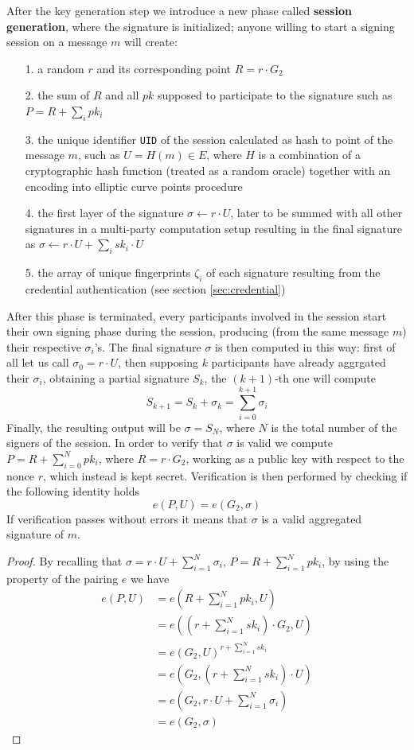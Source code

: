 \documentclass[twocolumn]{article}
\begin{document}
After the key generation step we introduce a new phase called \textbf{session generation}, where the signature is initialized; anyone willing to start a signing session on a message $m$ will create:
\begin{itemize}
    \item[1.] a random $r$ and its corresponding point $R = r\cdot G_2$
    \item[2.] the sum of $R$ and all $pk$ supposed to participate to the signature such as $P = R + \sum_i pk_i$
    \item[3.] the unique identifier \verb!UID! of the session calculated as hash to point of the message $m$, such as $U = H(m)\in E$, where $H$ is a combination of a cryptographic hash function (treated as a random oracle) together with an encoding into elliptic curve points procedure
    \item[4.] the first layer of the signature $\sigma \leftarrow r\cdot U$, later to be summed with all other signatures in a multi-party computation setup resulting in the final signature as $\sigma \leftarrow r\cdot U + \sum_i sk_i\cdot U$
    \item[5.] the array of unique fingerprints $\zeta_i$ of each signature resulting from the credential authentication (see section \ref{sec:credential}) 
\end{itemize}
After this phase is terminated, every participants involved in the session start their own signing phase during the session, producing (from the same message $m$) their respective $\sigma_i$'s. The final signature $\sigma$ is then computed in this way: first of all let us call $\sigma_0 = r\cdot U$, then supposing $k$ participants have already aggrgated their $\sigma_i$, obtaining a partial signature $S_k$, the $(k+1)$-th one will compute
\[
  S_{k+1}=S_k+\sigma_k = \sum_{i=0}^{k+1} \sigma_i
\]
Finally, the resulting output will be $\sigma = S_N$, where $N$ is the total number of the signers of the session. In order to verify that $\sigma$ is valid we compute $P = R + \sum_{i=0} ^N pk_i$, where $R = r\cdot G_2$, working as a public key with respect to the nonce $r$, which instead is kept secret. Verification is then performed by checking if the following identity holds
    \[ 
    e(P,U) = e(G_2,\sigma)
    \]
If verification passes without errors it means that $\sigma$ is a valid aggregated signature of $m$.
\begin{proof}
By recalling that $\sigma = r\cdot U + \sum_{i=1}^N \sigma_i$, $P = R + \sum_{i=1}^N pk_i$, by using the property of the pairing $e$ we have
\[
\begin{split}
    e(P,U)  &= e(R + \sum_{i=1}^N pk_i, U) \\
            &= e((r + \sum_{i=1}^N sk_i)\cdot G_2,U)\\
            &= e(G_2,U)^{r + \sum_{i=1}^N sk_i}\\
            &= e(G_2,(r + \sum_{i=1}^N sk_i)\cdot U) \\
            &= e(G_2,r\cdot U + \sum_{i=1}^N \sigma_i) \\
            &= e(G_2,\sigma)
\end{split}
\]
\end{proof} 
\end{document}
